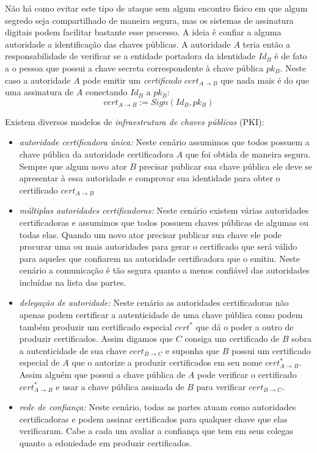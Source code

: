Não há como evitar este tipo de ataque sem algum encontro físico em que algum segredo seja compartilhado de maneira segura, mas os sistemas de assinatura digitais podem facilitar bastante esse processo.
A ideia é confiar a alguma autoridade a identificação das chaves públicas.
A autoridade $A$ teria então a responsabilidade de verificar se a entidade portadora da identidade $Id_B$ é de fato a o pessoa que possui a chave secreta correspondente à chave pública $pk_B$.
Neste caso a autoridade $A$ pode emitir um {\em certificado} $cert_{A \to B}$ que nada mais é do que uma assinatura de $A$ conectando $Id_B$ a $pk_B$:
\begin{displaymath}
  cert_{A \to B} := Sign(Id_B, pk_B)
\end{displaymath}

Existem diversos modelos de {\em infraestrutura de chaves públicas} (PKI):
\begin{itemize}
\item {\em autoridade certificadora única:} Neste cenário assumimos que todos possuem a chave pública da autoridade certificadora $A$ que foi obtida de maneira segura. 
Sempre que algum novo ator $B$ precisar publicar sua chave pública ele deve se apresentar à essa autoridade e comprovar sua identidade para obter o certificado $cert_{A \to B}$
\item {\em múltiplas autoridades certificadoras:} Neste cenário existem várias autoridades certificadoras e assumimos que todos possuem chaves públicas de algumas ou todas elas.
Quando um novo ator precisar publicar sua chave ele pode procurar uma ou mais autoridades para gerar o certificado que será válido para aqueles que confiarem na autoridade certificadora que o emitiu.
Neste cenário a comunicação é tão segura quanto a menos confiável das autoridades incluídas na lista das partes.
\item {\em delegação de autoridade:} Neste cenário as autoridades certificadoras não apenas podem certificar a autenticidade de uma chave pública como podem também produzir um certificado especial $cert^*$ que dá o poder a outro de produzir certificados. 
Assim digamos que $C$ consiga um certificado de $B$ sobra a autenticidade de sua chave $cert_{B \to C}$ e suponha que $B$ possui um certificado especial de $A$ que o autorize a produzir certificados em seu nome $cert^*_{A \to B}$.
Assim alguém que possui a chave pública de $A$ pode verificar o certificado $cert^*_{A \to B}$ e usar a chave pública assinada de $B$ para verificar $cert_{B \to C}$.
\item {\em rede de confiança:} Neste cenário, todas as partes atuam como autoridades certificadoras e podem assinar certificados para qualquer chave que elas verificaram.
Cabe a cada um avaliar a confiança que tem em seus colegas quanto a edoniedade em produzir certificados.
\end{itemize}

